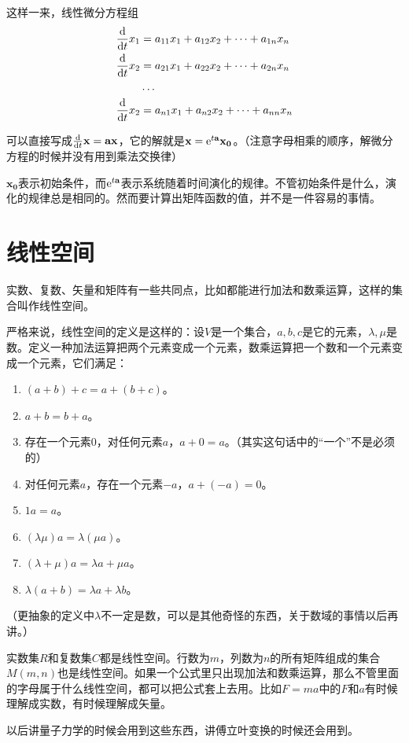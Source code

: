 这样一来，线性微分方程组
\begin{align*}
\frac{\mathop{}\!\mathrm{d}}{\mathop{}\!\mathrm{d} t} x_1 &=a_{1 1} x_1+a_{1 2} x_2+\dots+a_{1 n} x_n \\
\frac{\mathop{}\!\mathrm{d}}{\mathop{}\!\mathrm{d} t} x_2 &=a_{2 1} x_1+a_{2 2} x_2+\dots+a_{2 n} x_n \\
&\dots \\
\frac{\mathop{}\!\mathrm{d}}{\mathop{}\!\mathrm{d} t} x_2 &=a_{n 1} x_1+a_{n 2} x_2+\dots+a_{n n} x_n
\end{align*}

可以直接写成$\frac{\mathop{}\!\mathrm{d}}{\mathop{}\!\mathrm{d} t} \mathbf{x}=\mathbf{a} \mathbf{x}$，它的解就是$\mathbf{x}=\mathrm{e}^{t \mathbf{a}} \mathbf{x_0}$。（注意字母相乘的顺序，解微分方程的时候并没有用到乘法交换律）

$\mathbf{x_0}$表示初始条件，而$\mathrm{e}^{t \mathbf{a}}$表示系统随着时间演化的规律。不管初始条件是什么，演化的规律总是相同的。然而要计算出矩阵函数的值，并不是一件容易的事情。
\section{线性空间}
实数、复数、矢量和矩阵有一些共同点，比如都能进行加法和数乘运算，这样的集合叫作线性空间。

严格来说，线性空间的定义是这样的：设$V$是一个集合，$a, b, c$是它的元素，$\lambda, \mu$是数。定义一种加法运算把两个元素变成一个元素，数乘运算把一个数和一个元素变成一个元素，它们满足：
\begin{enumerate}
\item $(a+b)+c=a+(b+c)$。
\item $a+b=b+a$。
\item 存在一个元素$0$，对任何元素$a$，$a+0=a$。（其实这句话中的“一个”不是必须的）
\item 对任何元素$a$，存在一个元素$-a$，$a+(-a)=0$。
\item $1 a=a$。
\item $(\lambda \mu) a=\lambda (\mu a)$。
\item $(\lambda+\mu) a=\lambda a +\mu a$。
\item $\lambda (a+b)=\lambda a +\lambda b$。
\end{enumerate}

（更抽象的定义中$\lambda$不一定是数，可以是其他奇怪的东西，关于数域的事情以后再讲。）

实数集$R$和复数集$C$都是线性空间。行数为$m$，列数为$n$的所有矩阵组成的集合$M(m, n)$也是线性空间。如果一个公式里只出现加法和数乘运算，那么不管里面的字母属于什么线性空间，都可以把公式套上去用。比如$F=m a$中的$F$和$a$有时候理解成实数，有时候理解成矢量。

以后讲量子力学的时候会用到这些东西，讲傅立叶变换的时候还会用到。
